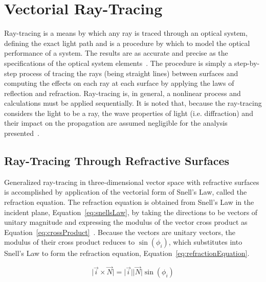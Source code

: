 \section{Vectorial Ray-Tracing}
\label{sec:vectRayTrace}

Ray-tracing is a means by which any ray is traced through an optical system, defining the exact light path and is a procedure by which to model the optical performance of a system. The results are as accurate and precise as the specifications of the optical system elements~\cite{Hecht}. The procedure is simply a step-by-step process of tracing the rays (being straight lines) between surfaces and computing the effects on each ray at each surface by applying the laws of reflection and refraction. Ray-tracing is, in general, a nonlinear process and calculations must be applied sequentially. It is noted that, because the ray-tracing considers the light to be a ray, the wave properties of light (i.e. diffraction) and their impact on the propagation are assumed negligible for the analysis presented~\cite{Hecht}.

\subsection{Ray-Tracing Through Refractive Surfaces}
\label{sec:refractiveRayTrace}
Generalized ray-tracing in three-dimensional vector space with refractive surfaces is accomplished by application of the vectorial form of Snell's Law, called the refraction equation. The refraction equation is obtained from Snell's Law in the incident plane, Equation~\eqref{eq:snellsLaw}, by taking the directions to be vectors of unitary magnitude and expressing the modulus of the vector cross product as Equation~\eqref{eq:crossProduct}~\cite{RealRayTracing}. Because the vectors are unitary vectors, the modulus of their cross product reduces to $\sin(\phi_i)$, which substitutes into Snell's Law to form the refraction equation, Equation~\eqref{eq:refractionEquation}.

\begin{equation}		%
\vert\vec{i}\times\vec{N}\vert = \vert\vec{i}\vert\vert\vec{N}\vert\sin(\phi_i)
\label{eq:crossProduct}
\end{equation}


